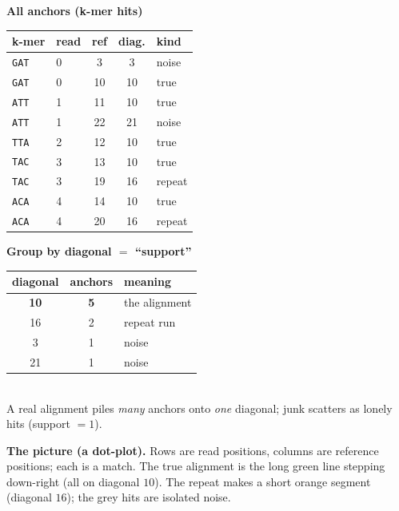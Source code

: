 \documentclass[11pt]{article}
\newcommand{\B}{\textbullet}
\begin{document}
\begin{center}
\begin{minipage}[t]{0.52\textwidth}
\centering
\small
\textbf{All anchors (k-mer hits)}\\[3pt]
\begin{tabular}{@{}llccl@{}}
\toprule
k-mer & read & ref & diag. & kind \\
\midrule
\rowcolor{cJunk}\texttt{GAT} & 0 & 3  & 3  & noise \\
\rowcolor{cTrue}\texttt{GAT} & 0 & 10 & 10 & true \\
\rowcolor{cTrue}\texttt{ATT} & 1 & 11 & 10 & true \\
\rowcolor{cJunk}\texttt{ATT} & 1 & 22 & 21 & noise \\
\rowcolor{cTrue}\texttt{TTA} & 2 & 12 & 10 & true \\
\rowcolor{cTrue}\texttt{TAC} & 3 & 13 & 10 & true \\
\rowcolor{cRepeat}\texttt{TAC} & 3 & 19 & 16 & repeat \\
\rowcolor{cTrue}\texttt{ACA} & 4 & 14 & 10 & true \\
\rowcolor{cRepeat}\texttt{ACA} & 4 & 20 & 16 & repeat \\
\bottomrule
\end{tabular}
\end{minipage}%
\hfill
\begin{minipage}[t]{0.44\textwidth}
\centering
\small
\textbf{Group by diagonal $=$ ``support''}\\[3pt]
\begin{tabular}{@{}ccl@{}}
\toprule
diagonal & anchors & meaning \\
\midrule
\rowcolor{cTrue}\textbf{10} & \textbf{5} & the alignment \\
\rowcolor{cRepeat}16 & 2 & repeat run \\
\rowcolor{cJunk}3  & 1 & noise \\
\rowcolor{cJunk}21 & 1 & noise \\
\bottomrule
\end{tabular}\\[6pt]
\footnotesize
A real alignment piles \emph{many} anchors onto \emph{one} diagonal;
junk scatters as lonely hits (support $=1$).
\end{minipage}
\end{center}

\textbf{The picture (a dot-plot).} Rows are read positions, columns are reference positions; each
\B{} is a match. The true alignment is the long green line stepping down-right (all on diagonal $10$).
The repeat makes a short orange segment (diagonal $16$); the grey hits are isolated noise.
\end{document}
